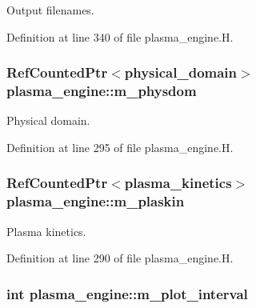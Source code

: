 Output filenames. 



Definition at line 340 of file plasma\+\_\+engine.\+H.

\subsubsection[{\texorpdfstring{m\+\_\+physdom}{m_physdom}}]{\setlength{\rightskip}{0pt plus 5cm}Ref\+Counted\+Ptr$<${\bf physical\+\_\+domain}$>$ plasma\+\_\+engine\+::m\+\_\+physdom\hspace{0.3cm}{\ttfamily [protected]}}\hypertarget{classplasma__engine_a9a74dc0c212ba3df4eca3bf3e86692bb}{}\label{classplasma__engine_a9a74dc0c212ba3df4eca3bf3e86692bb}


Physical domain. 



Definition at line 295 of file plasma\+\_\+engine.\+H.

\subsubsection[{\texorpdfstring{m\+\_\+plaskin}{m_plaskin}}]{\setlength{\rightskip}{0pt plus 5cm}Ref\+Counted\+Ptr$<${\bf plasma\+\_\+kinetics}$>$ plasma\+\_\+engine\+::m\+\_\+plaskin\hspace{0.3cm}{\ttfamily [protected]}}\hypertarget{classplasma__engine_ab5ad9d483a1b69f5cc7640fd0ad6bdd2}{}\label{classplasma__engine_ab5ad9d483a1b69f5cc7640fd0ad6bdd2}


Plasma kinetics. 



Definition at line 290 of file plasma\+\_\+engine.\+H.

\subsubsection[{\texorpdfstring{m\+\_\+plot\+\_\+interval}{m_plot_interval}}]{\setlength{\rightskip}{0pt plus 5cm}int plasma\+\_\+engine\+::m\+\_\+plot\+\_\+interval\hspace{0.3cm}{\ttfamily [protected]}}\hypertarget{classplasma__engine_ad61988b7cf22b7589b95afdbbf17fd38}{}\label{classplasma__engine_ad61988b7cf22b7589b95afdbbf17fd38}


